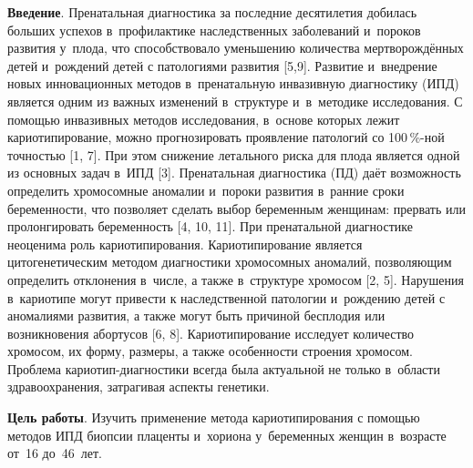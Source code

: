 \vspace{-16pt}



\makeProcTitleIIRazdel
{}

\textbf{Введение}. Пренатальная диагностика за последние десятилетия добилась больших успехов в~профилактике наследственных заболеваний и~пороков развития у~плода, что способствовало уменьшению количества мертворождённых детей и~рождений детей с патологиями развития [5,9]. Развитие и~внедрение новых инновационных методов в~пренатальную инвазивную диагностику (ИПД) является одним из важных изменений в~структуре и~в~методике исследования. С помощью инвазивных методов исследования, в~основе которых лежит кариотипирование, можно прогнозировать проявление патологий со 100\,\%-ной точностью [1, 7]. При этом снижение летального риска для плода является одной из основных задач в~ИПД [3]. Пренатальная диагностика (ПД) даёт возможность определить хромосомные аномалии и~пороки развития в~ранние сроки беременности, что позволяет сделать выбор беременным женщинам: прервать или пролонгировать беременность [4, 10, 11]. При пренатальной диагностике неоценима роль кариотипирования. Кариотипирование является цитогенетическим методом диагностики хромосомных аномалий, позволяющим определить отклонения в~числе, а также в~структуре хромосом [2, 5]. Нарушения в~кариотипе могут привести к наследственной патологии и~рождению детей с аномалиями развития, а также могут быть причиной бесплодия или возникновения абортусов [6, 8]. Кариотипирование исследует количество хромосом, их форму, размеры, а также особенности строения хромосом. Проблема кариотип-диагностики всегда была актуальной не только в~области здравоохранения, затрагивая аспекты генетики.

\textbf{Цель работы}. Изучить применение метода кариотипирования с помощью методов ИПД биопсии плаценты и~хориона у~беременных женщин в~возрасте от~16 до~46~лет.

